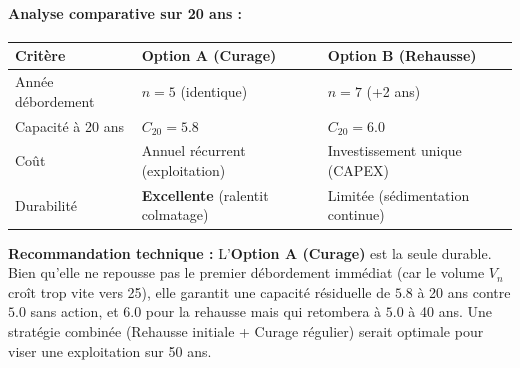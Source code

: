 \documentclass[11pt]{article}
\begin{document}
\begin{exoresolu}
\paragraph{Analyse comparative sur 20 ans :}
\begin{center}
\begin{tabularx}{\linewidth}{|l|X|X|}\hline
\textbf{Critère} & \textbf{Option A (Curage)} & \textbf{Option B (Rehausse)} \\ \hline
Année débordement & $n=5$ (identique) & $n=7$ (+2 ans) \\ \hline
Capacité à 20 ans & $C_{20}=\num{5,8}$ & $C_{20}=\num{6,0}$ \\ \hline
Coût & Annuel récurrent (exploitation) & Investissement unique (CAPEX) \\ \hline
Durabilité & \textbf{Excellente} (ralentit colmatage) & Limitée (sédimentation continue) \\ \hline
\end{tabularx}
\end{center}

\noindent \textbf{Recommandation technique :} L'\textbf{Option A (Curage)} est la seule durable. Bien qu'elle ne repousse pas le premier débordement immédiat (car le volume $V_n$ croît trop vite vers 25), elle garantit une capacité résiduelle de $\num{5,8}$ à 20 ans contre $\num{5,0}$ sans action, et $\num{6,0}$ pour la rehausse mais qui retombera à $\num{5,0}$ à 40 ans. Une stratégie combinée (Rehausse initiale + Curage régulier) serait optimale pour viser une exploitation sur 50 ans.

\end{exoresolu}
\end{document}
